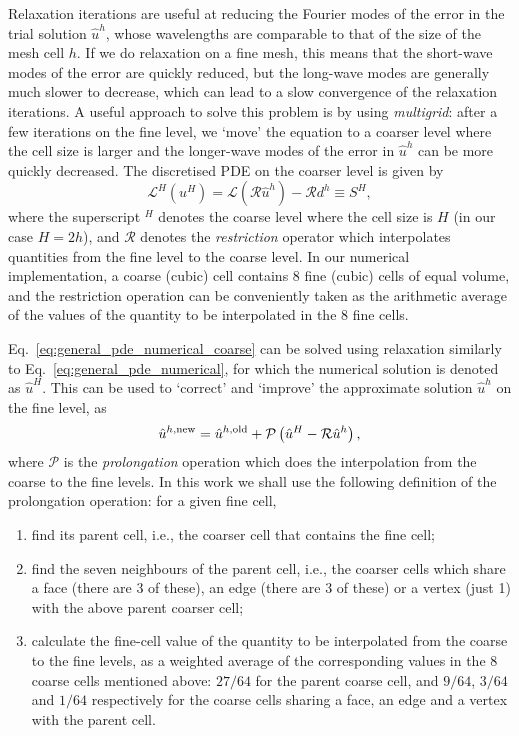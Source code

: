 Relaxation iterations are useful at reducing the Fourier modes of the error in the trial solution $\hat{u}^h$, whose wavelengths are comparable to that of the size of the mesh cell $h$. If we do relaxation on a fine mesh, this means that the short-wave modes of the error are quickly reduced, but the long-wave modes are generally much slower to decrease, which can lead to a slow convergence of the relaxation iterations. A useful approach to solve this problem is by using {\it multigrid}: after a few iterations on the fine level, we `move' the equation to a coarser level where the cell size is larger and the longer-wave modes of the error in $\hat{u}^h$ can be more quickly decreased. The discretised PDE on the coarser level is given by
\begin{equation}\label{eq:general_pde_numerical_coarse}
    \mathcal{L}^H(u^H) = \mathcal{L}\left(\mathcal{R}\hat{u}^h\right) - \mathcal{R}d^h \equiv S^H,
\end{equation}
where the superscript $^H$ denotes the coarse level where the cell size is $H$ (in our case $H=2h$), and $\mathcal{R}$ denotes the \textit{restriction} operator which interpolates quantities from the fine level to the coarse level. In our numerical implementation, a coarse (cubic) cell contains 8 fine (cubic) cells of equal volume, and the restriction operation can be conveniently taken as the arithmetic average of the values of the quantity to be interpolated in the 8 fine cells. 

Eq.~\eqref{eq:general_pde_numerical_coarse} can be solved using relaxation similarly to Eq.~\eqref{eq:general_pde_numerical}, for which the numerical solution is denoted as $\hat{u}^H$. This can be used to `correct' and `improve' the approximate solution $\hat{u}^h$ on the fine level, as
\begin{equation}\label{eq:solution_correction}
    \hat{u}^{h,{\rm new}} = \hat{u}^{h,{\rm old}} + \mathcal{P}\left(\hat{u}^H - \mathcal{R}\hat{u}^h\right),
\end{equation}
where $\mathcal{P}$ is the \textit{prolongation} operation which does the interpolation from the coarse to the fine levels. In this work we shall use the following definition of the prolongation operation: for a given fine cell,
\begin{enumerate}
    \item find its parent cell, i.e., the coarser cell that contains the fine cell;
    \item find the seven neighbours of the parent cell, i.e., the coarser cells which share a face (there are 3 of these), an edge (there are 3 of these) or a vertex (just 1) with the above parent coarser cell;
    \item calculate the fine-cell value of the quantity to be interpolated from the coarse to the fine levels, as a weighted average of the corresponding values in the 8 coarse cells mentioned above: $27/64$ for the parent coarse cell, and $9/64$, $3/64$ and $1/64$ respectively for the coarse cells sharing a face, an edge and a vertex with the parent cell. 
\end{enumerate}

